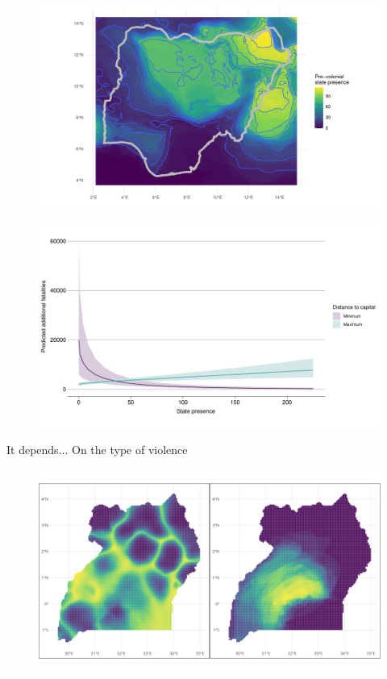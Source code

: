 \documentclass{beamer}
\begin{document}
\begin{frame} %
	\begin{figure}
		\includegraphics[width=\linewidth]{../R/Output/nigeria.pdf}
	\end{figure}
\end{frame}

\begin{frame}
	\begin{figure}
		\includegraphics[width=\linewidth]{"../R/Output/interdeathszinbplot.pdf"}
	\end{figure}
\end{frame}


\begin{frame}{It depends...}
	\centering
	\Large On the type of violence
\end{frame}

\begin{frame} %
	\begin{figure}
		\includegraphics[width=\linewidth]{img/ugaplots.png}
	\end{figure}
\end{frame}
\end{document}

